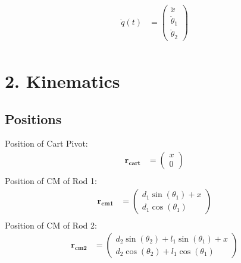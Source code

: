 \documentclass{article}%
\begin{document}
%
\begin{align*}%
\ddot{q}(t) &= \displaystyle \begin{pmatrix}\ddot{x}\\\ddot{\theta}_{1}\\\ddot{\theta}_{2}\end{pmatrix} \\%
\end{align*}

%
\section{2. Kinematics}%
\label{sec:2.Kinematics}%
\subsection{Positions}%
\label{subsec:Positions}%
Position of Cart Pivot:%
\begin{align*}%
\mathbf{r_{cart}} &= \displaystyle \begin{pmatrix}x\\0\end{pmatrix} \\%
\end{align*}%
Position of CM of Rod 1:%
\begin{align*}%
\mathbf{r_{cm1}} &= \displaystyle \begin{pmatrix}d_{1} \sin(\theta_1 ) + x\\d_{1} \cos(\theta_1 )\end{pmatrix} \\%
\end{align*}%
Position of CM of Rod 2:%
\begin{align*}%
\mathbf{r_{cm2}} &= \displaystyle \begin{pmatrix}d_{2} \sin(\theta_2 ) + l_{1} \sin(\theta_1 ) + x\\d_{2} \cos(\theta_2 ) + l_{1} \cos(\theta_1 )\end{pmatrix} \\%
\end{align*}

%
\end{document}
